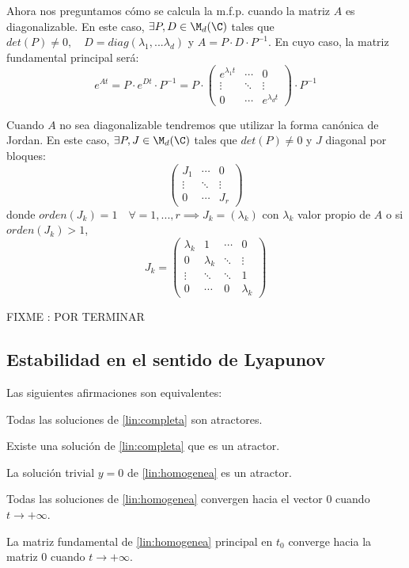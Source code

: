 Ahora nos preguntamos cómo se calcula la m.f.p. cuando la matriz $A$ es diagonalizable. En este caso, $\exists P, D \in \M_d(\C)$ tales que $det(P)\neq 0, \quad D=diag(\lambda_1,...\lambda_d)$ y $A=P\cdot D \cdot P^{-1}$. En cuyo caso, la matriz fundamental principal será:
$$e^{At}=P\cdot e^{Dt}\cdot P^{-1}=P \cdot  \begin{pmatrix}e^{\lambda_1 t} & \cdots & 0 \\ \vdots & \ddots & \vdots \\0 & \cdots & e^{\lambda_d t}\end{pmatrix} \cdot P^{-1}$$


Cuando $A$ no sea diagonalizable tendremos que utilizar la forma canónica de Jordan. En este caso, $\exists P,J\in \M_d(\C)$ tales que $det(P) \neq 0 $ y $J$ diagonal por bloques:
$$\begin{pmatrix}J_1 & \cdots & 0\\
 \vdots & \ddots & \vdots \\
 0& \cdots & J_r \end{pmatrix}$$
 donde $orden(J_k)=1 \quad \forall =1,...,r \implies J_k=(\lambda_k)$ con $\lambda_k$ valor propio de $A$ o si $orden(J_k)>1$,
 $$J_k=
 \begin{pmatrix}
 \lambda_k & 1  &\cdots & 0 \\
  0 & \lambda_k & \ddots & \vdots \\
  \vdots & \ddots & \ddots & 1 \\
  0 & \cdots & 0 & \lambda_k
\end{pmatrix}$$

FIXME : POR TERMINAR
\subsection{Estabilidad en el sentido de Lyapunov}

\begin{nprop}
Las siguientes afirmaciones son equivalentes:
\begin{nlist}
\item Todas las soluciones de \eqref{lin:completa} son atractores.
\item Existe una solución de \eqref{lin:completa} que es un atractor.
\item La solución trivial $y = 0$ de \eqref{lin:homogenea} es un atractor.
\item Todas las soluciones de \eqref{lin:homogenea} convergen hacia el vector 0 cuando $t \to +\infty$.
\item La matriz fundamental de \eqref{lin:homogenea} principal en $t_0$ converge hacia la matriz 0 cuando $t \to +\infty$.
\end{nlist}
\end{nprop}

